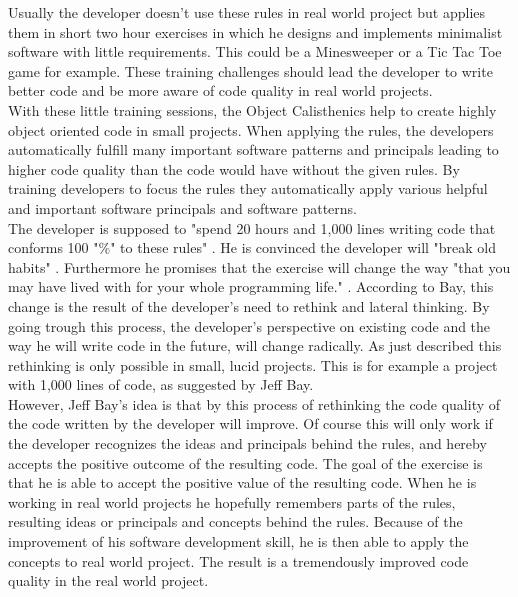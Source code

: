 Usually the developer doesn't use these rules in real world project but applies them in short two hour exercises in which he designs and implements minimalist software with little requirements. This could be a Minesweeper or a Tic Tac Toe game for example. These training challenges should lead the developer to write better code and be more aware of code quality in real world projects.\\

With these little training sessions, the Object Calisthenics help to create highly object oriented code  in small projects. When applying the rules, the developers automatically fulfill many important software patterns and principals leading to higher code quality than the code would have without the given rules. By training developers to focus the rules they automatically apply various helpful and important software principals and software patterns. \\

The developer is supposed to "spend 20 hours and 1,000 lines writing code that conforms 100 "\%"  to these rules" \cite[p. 80]{oc2008}. He is convinced the developer will "break old habits" \cite[p. 80]{oc2008}. Furthermore he promises that the exercise will change the way "that you may have lived with for your whole programming life." \cite[p. 80]{oc2008}. According to Bay, this change is the result of the developer's need to rethink and lateral thinking. By going trough this process, the developer's perspective on existing code and the way he will write code in the future, will change radically. As just described this rethinking is only possible in small, lucid projects. This is for example a project with 1,000 lines of code, as suggested by Jeff Bay. \\

However, Jeff Bay's idea is that by this process of rethinking the code quality of the code written by the developer will improve.
Of course this will only work if the developer recognizes the ideas and principals behind the rules, and hereby accepts the positive outcome of the resulting code. The goal of the exercise is that he is able to accept the positive value of the resulting code. When he is working in real world projects he hopefully remembers parts of the rules, resulting ideas or principals and concepts behind the rules. Because of the improvement of his software development skill, he is then able to apply the concepts to real world project. The result is a tremendously improved code quality in the real world project.\\

